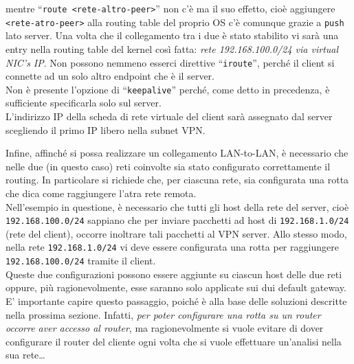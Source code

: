 mentre ``\texttt{route <rete-altro-peer>}'' non c'è ma il suo effetto, cioè aggiungere
\texttt{<rete-atro-peer>} alla routing table del proprio OS c'è comunque grazie a \texttt{push}
lato server.
Una volta che il collegamento tra i due è stato stabilito vi sarà una entry
nella routing table del kernel così fatta: \textit{rete 192.168.100.0/24 via
	virtual NIC's IP}. Non possono nemmeno esserci direttive ``\texttt{iroute}'', perché
il client si connette ad un solo altro endpoint che è il server.\\
Non è presente l'opzione di ``\texttt{keepalive}'' perché, come detto in
precedenza, è sufficiente specificarla solo sul server.\\
L'indirizzo IP della scheda di rete virtuale del client sarà assegnato dal server scegliendo
il primo IP libero nella subnet VPN.


Infine, affinché si possa realizzare un collegamento LAN-to-LAN, è necessario che
nelle due (in questo caso) reti coinvolte sia stato configurato correttamente
il routing. In particolare si richiede che, per ciascuna rete, sia configurata una rotta
che dica come raggiungere l'atra rete remota.\\
Nell'esempio in questione, è necessario che tutti gli host della rete del server, cioè
\texttt{192.168.100.0/24} sappiano che per inviare pacchetti ad host di \texttt{192.168.1.0/24}
(rete del client), occorre inoltrare tali pacchetti al VPN server. Allo stesso modo,
nella rete \texttt{192.168.1.0/24} vi deve essere configurata una rotta per raggiungere
\texttt{192.168.100.0/24} tramite il client.\\
Queste due configurazioni possono essere aggiunte su ciascun host delle due reti oppure,
più ragionevolmente, esse saranno solo applicate sui dui default gateway. E' importante
capire questo passaggio, poiché è alla base delle soluzioni descritte nella prossima
sezione. Infatti, \textit{per poter configurare una rotta su un router occorre aver
accesso al router}, ma ragionevolmente si vuole evitare di dover configurare
il router del cliente ogni volta che si vuole effettuare un'analisi nella sua rete\ldots




